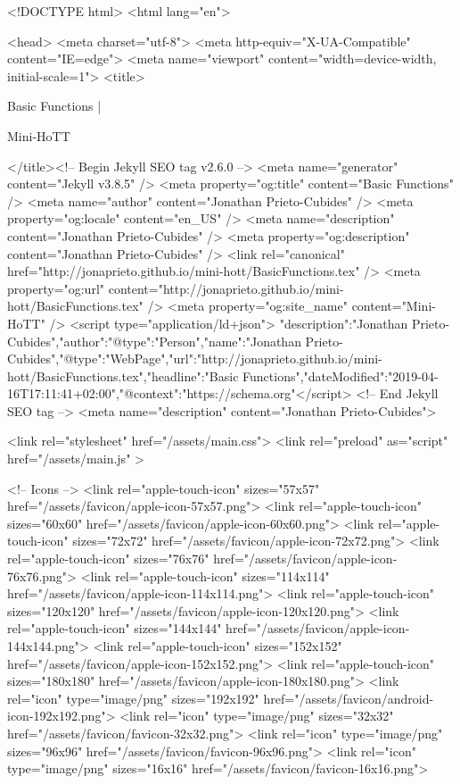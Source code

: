 <!DOCTYPE html>
<html lang="en">

<head>
  <meta charset="utf-8">
  <meta http-equiv="X-UA-Compatible" content="IE=edge">
  <meta name="viewport" content="width=device-width, initial-scale=1">
  <title>
    
      
        Basic Functions |
      
        Mini-HoTT
    
  </title><!-- Begin Jekyll SEO tag v2.6.0 -->
<meta name="generator" content="Jekyll v3.8.5" />
<meta property="og:title" content="Basic Functions" />
<meta name="author" content="Jonathan Prieto-Cubides" />
<meta property="og:locale" content="en_US" />
<meta name="description" content="Jonathan Prieto-Cubides" />
<meta property="og:description" content="Jonathan Prieto-Cubides" />
<link rel="canonical" href="http://jonaprieto.github.io/mini-hott/BasicFunctions.tex" />
<meta property="og:url" content="http://jonaprieto.github.io/mini-hott/BasicFunctions.tex" />
<meta property="og:site_name" content="Mini-HoTT" />
<script type="application/ld+json">
{"description":"Jonathan Prieto-Cubides","author":{"@type":"Person","name":"Jonathan Prieto-Cubides"},"@type":"WebPage","url":"http://jonaprieto.github.io/mini-hott/BasicFunctions.tex","headline":"Basic Functions","dateModified":"2019-04-16T17:11:41+02:00","@context":"https://schema.org"}</script>
<!-- End Jekyll SEO tag -->
<meta name="description" content="Jonathan Prieto-Cubides">

  <link rel="stylesheet" href="/assets/main.css">
  <link rel="preload" as="script" href="/assets/main.js" >

  <!-- Icons -->
  <link rel="apple-touch-icon" sizes="57x57" href="/assets/favicon/apple-icon-57x57.png">
  <link rel="apple-touch-icon" sizes="60x60" href="/assets/favicon/apple-icon-60x60.png">
  <link rel="apple-touch-icon" sizes="72x72" href="/assets/favicon/apple-icon-72x72.png">
  <link rel="apple-touch-icon" sizes="76x76" href="/assets/favicon/apple-icon-76x76.png">
  <link rel="apple-touch-icon" sizes="114x114" href="/assets/favicon/apple-icon-114x114.png">
  <link rel="apple-touch-icon" sizes="120x120" href="/assets/favicon/apple-icon-120x120.png">
  <link rel="apple-touch-icon" sizes="144x144" href="/assets/favicon/apple-icon-144x144.png">
  <link rel="apple-touch-icon" sizes="152x152" href="/assets/favicon/apple-icon-152x152.png">
  <link rel="apple-touch-icon" sizes="180x180" href="/assets/favicon/apple-icon-180x180.png">
  <link rel="icon" type="image/png" sizes="192x192"  href="/assets/favicon/android-icon-192x192.png">
  <link rel="icon" type="image/png" sizes="32x32" href="/assets/favicon/favicon-32x32.png">
  <link rel="icon" type="image/png" sizes="96x96" href="/assets/favicon/favicon-96x96.png">
  <link rel="icon" type="image/png" sizes="16x16" href="/assets/favicon/favicon-16x16.png">

